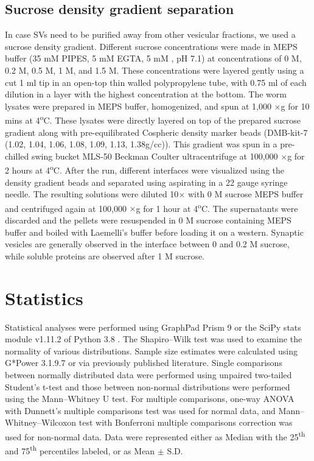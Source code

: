 \subsection{Sucrose density gradient separation}

In case SVs need to be purified away from other vesicular fractions, we used a sucrose density gradient. Different sucrose concentrations were made in MEPS buffer (35 mM PIPES, 5 mM EGTA, 5 mM , pH 7.1) at concentrations of 0 M, 0.2 M, 0.5 M, 1 M, and 1.5 M. These concentrations were layered gently using a cut 1 ml tip in an open-top thin walled polypropylene tube, with 0.75 ml of each dilution in a layer with the highest concentration at the bottom. The worm lysates were prepared in MEPS buffer, homogenized, and spun at 1,000 $\times$g for 10 mins at 4\textsuperscript{o}C. These lysates were directly layered on top of the prepared sucrose gradient along with pre-equilibrated Cospheric density marker beads (DMB-kit-7 (1.02, 1.04, 1.06, 1.08, 1.09, 1.13, 1.38g/cc)). This gradient was spun in a pre-chilled swing bucket MLS-50 Beckman Coulter ultracentrifuge at 100,000 $\times$g for 2 hours at 4\textsuperscript{o}C. After the run, different interfaces were visualized using the density gradient beads and separated using aspirating in a 22 gauge syringe needle. The resulting solutions were diluted 10$\times$ with 0 M sucrose MEPS buffer and centrifuged again at 100,000 $\times$g for 1 hour at 4\textsuperscript{o}C. The supernatants were discarded and the pellets were resuspended in 0 M sucrose containing MEPS buffer and boiled with Laemelli's buffer before loading it on a western. Synaptic vesicles are generally observed in the interface between 0 and 0.2 M sucrose, while soluble proteins are observed after 1 M sucrose.

\section{Statistics}

Statistical analyses were performed using GraphPad Prism 9 or the SciPy stats module v1.11.2 of Python 3.8 \parencite{virtanen2020}. The Shapiro–Wilk test was used to examine the normality of various distributions. Sample size estimates were calculated using G*Power 3.1.9.7 \parencite{faul2007} or via previously published literature. Single comparisons between normally distributed data were performed using unpaired two-tailed Student’s t-test and those between non-normal distributions were performed using the Mann–Whitney U test. For multiple comparisons, one-way ANOVA with Dunnett’s multiple comparisons test was used for normal data, and Mann–Whitney–Wilcoxon test with Bonferroni multiple comparisons correction was used for non-normal data. Data were represented either as Median with the 25\textsuperscript{th} and 75\textsuperscript{th} percentiles labeled, or as Mean $\pm$ S.D.


